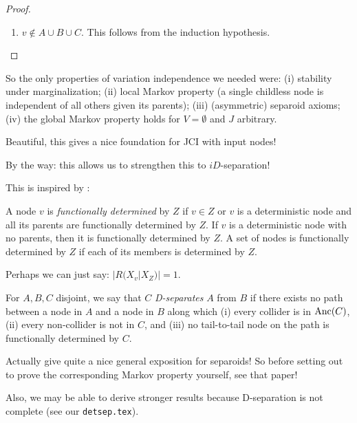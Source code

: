 \begin{proof}
\begin{enumerate}[label=(\roman*)]
    Therefore we get the implications:
    \begin{align*}
    A  \idPerp_G  B \given C 
      & \xRightarrow{\text{decomposition}}  & A' \idPerp_G  B' \given C'\dcup\{v\} \\
      & \xRightarrow{\text{lemma}} &  A' \dcup \{v\} \idPerp_G  B' \given C' \qquad \lor \qquad A' \idPerp_G B' \dcup \{v\} \given C' \\
      & \xRightarrow{\text{cases (i),(ii)}} &  X_{A'},X_v \Indep_{R}  X_{B'} \given X_{C'} \quad \lor \quad X_{A'} \Indep_{R}  X_{B'},X_v \given X_{C'} \\
      & \xRightarrow{\text{weak union}} &  X_{A'} \Indep_{R}  X_{B'} \given X_{C} \quad \lor \quad X_{A'} \Indep_{R}  X_{B'} \given X_{C} \\
      & \xRightarrow{\text{redundancy}} &  X_A \Indep_{R}  X_B \given X_{C} \quad \lor \quad X_A \Indep_{R}  X_B \given X_{C}
    \end{align*}
    This shows the claim in case (iii).

  \item $v \notin A \cup B \cup C$. This follows from the induction hypothesis.
\end{enumerate}
\end{proof}
So the only properties of variation independence we needed were:
(i) stability under marginalization; (ii) local Markov property (a single childless node is independent of all others given its parents); (iii) (asymmetric) separoid axioms;
(iv) the global Markov property holds for $V=\emptyset$ and $J$ arbitrary. 

Beautiful, this gives a nice foundation for JCI with input nodes!


By the way: this allows us to strengthen this to $iD$-separation!

This is inspired by \cite{GVP1990}:
\begin{Def}
  A node $v$ is \emph{functionally determined} by $Z$ if $v \in Z$ or $v$ is a deterministic node and all its parents are functionally determined by $Z$.
  If $v$ is a deterministic node with no parents, then it is functionally determined by $Z$.
  A set of nodes is functionally determined by $Z$ if each of its members is determined by $Z$.
\end{Def}
Perhaps we can just say: $|R(X_v | X_Z)| = 1$.

\begin{Def}
  For $A,B,C$ disjoint, we say that $C$ \emph{D-separates} $A$ from $B$ if there exists no path between a node in $A$ and a node in $B$ along which (i) every collider is in $\mathrm{Anc}(C)$, (ii) every non-collider is not in $C$, and (iii) no tail-to-tail node on the path is functionally determined by $C$.
\end{Def}

Actually \cite{GVP1990} give quite a nice general exposition for separoids!
So before setting out to prove the corresponding Markov property yourself, see that paper!

Also, we may be able to derive stronger results because D-separation is not complete (see our \texttt{detsep.tex}).
